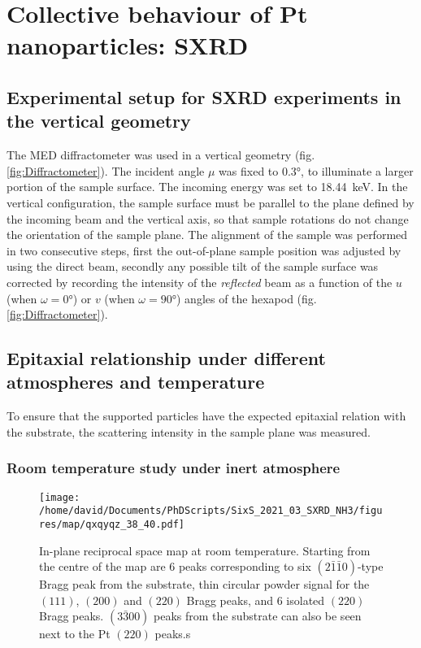 \section{Collective behaviour of Pt nanoparticles: SXRD}

\subsection{Experimental setup for SXRD experiments in the vertical geometry}\label{sec:SXRDSetupV}

The MED diffractometer was used in a vertical geometry (fig. \ref{fig:Diffractometer}).
The incident angle $\mu$ was fixed to \ang{0.3}, to illuminate a larger portion of the sample surface.
The incoming energy was set to \qty{18.44}{\keV}.
In the vertical configuration, the sample surface must be parallel to the plane defined by the incoming beam and the vertical axis, so that sample rotations do not change the orientation of the sample plane.
The alignment of the sample was performed in two consecutive steps, first the out-of-plane sample position was adjusted by using the direct beam, secondly any possible tilt of the sample surface was corrected by recording the intensity of the \textit{reflected} beam as a function of the $u$ (when $\omega=\ang{0}$) or $v$ (when $\omega=\ang{90}$) angles of the hexapod (fig. \ref{fig:Diffractometer}).

\subsection{Epitaxial relationship under different atmospheres and temperature}

To ensure that the  supported particles have the expected epitaxial relation with the substrate, the scattering intensity in the sample plane was measured.

\subsubsection{Room temperature study under inert atmosphere}

\begin{figure}[!htb]
    \centering
    \texttt{[image: /home/david/Documents/PhDScripts/SixS\_2021\_03\_SXRD\_NH3/figures/map/qxqyqz\_38\_40.pdf]}
    \caption{
        In-plane reciprocal space map at room temperature.
        Starting from the centre of the map are 6 peaks corresponding to six $(2\bar{1}\bar{1}0)$-type Bragg peak from the substrate, thin circular powder signal for the $(111)$, $(200)$ and $(220)$ Bragg peaks, and 6 isolated $(220)$ Bragg peaks.
        $(3\bar{3}00)$ peaks from the substrate can also be seen next to the Pt $(220)$ peaks.s
    }
    \label{fig:QxQyMap}
\end{figure}

